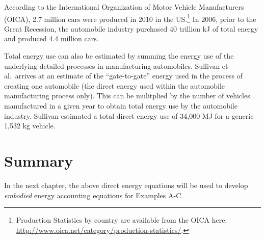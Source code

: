 According to the International Organization of Motor Vehicle Manufacturers (OICA), 
2.7 million cars were produced in 2010 in the US.\footnote{Production Statistics by country are available from the OICA here: \url{http://www.oica.net/category/production-statistics/}.} In 2006, prior to the 
Great Recession, the automobile industry purchased 40 trillion kJ of total energy and 
produced 4.4 million cars.

Total energy use can also be estimated by summing the energy use of the 
underlying detailed processes in manufacturing automobiles. 
Sullivan et al.\ arrives at an estimate of the ``gate-to-gate'' energy
used in the process of creating one automobile (the direct energy used within the
automobile manufacturing process only).\cite{Sullivan2010} This can be
mulitplied by the number of vehicles manufactured in a given year to obtain total energy use by the 
automobile industry. Sullivan estimated a total direct energy use of 34,000 MJ for a generic 1,532 kg vehicle. 


\section{Summary}
\label{sec:energy_summary}

In the next chapter, the above direct energy equations will be used to 
develop \emph{embodied} energy accounting equations for Examples A-C.











